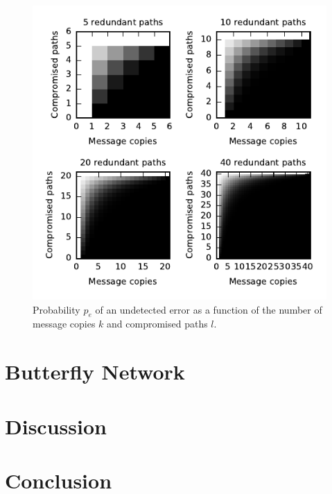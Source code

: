 \documentclass[twocolumn]{article}
\begin{document}
\begin{figure}
\includegraphics{fig-perror.pdf}
\caption{
Probability $p_e$ of an undetected error as a function of the number of message
copies $k$ and compromised paths $l$.
\label{fig:perror}
}
\end{figure}

\section{Butterfly Network}

\section{Discussion}

\section{Conclusion}



\end{document}
